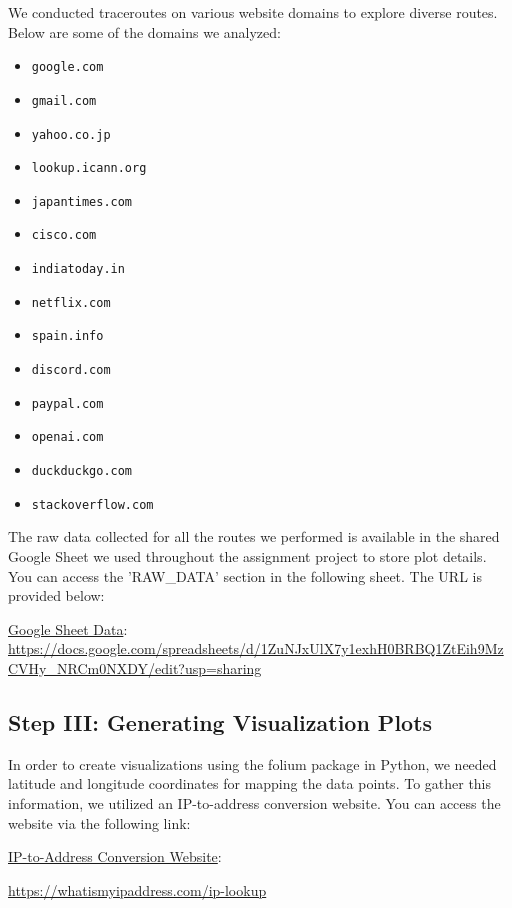 \documentclass{article}
\begin{document}
We conducted traceroutes on various website domains to explore diverse routes. Below are some of the domains we analyzed:

\begin{itemize}
    \item \texttt{google.com}
    \item \texttt{gmail.com}
    \item \texttt{yahoo.co.jp}
    \item \texttt{lookup.icann.org}
    \item \texttt{japantimes.com}
    \item \texttt{cisco.com}
    \item \texttt{indiatoday.in}
    \item \texttt{netflix.com}
    \item \texttt{spain.info}
    \item \texttt{discord.com}
    \item \texttt{paypal.com}
    \item \texttt{openai.com}
    \item \texttt{duckduckgo.com}
    \item \texttt{stackoverflow.com}
\end{itemize}
The raw data collected for all the routes we performed is available in the shared Google Sheet we used throughout the assignment project to store plot details. You can access the 'RAW\_DATA' section in the following sheet. The URL is provided below:

\href{https://docs.google.com/spreadsheets/d/1ZuNJxUlX7y1exhH0BRBQ1ZtEih9MzCVHy_NRCm0NXDY/edit?usp=sharing}{Google Sheet Data}: \\ \url{https://docs.google.com/spreadsheets/d/1ZuNJxUlX7y1exhH0BRBQ1ZtEih9MzCVHy_NRCm0NXDY/edit?usp=sharing}

\subsection{Step III: Generating Visualization Plots}

In order to create visualizations using the folium package in Python, we needed latitude and longitude coordinates for mapping the data points. To gather this information, we utilized an IP-to-address conversion website. You can access the website via the following link:

\href{https://whatismyipaddress.com/ip-lookup}{IP-to-Address Conversion Website}:

\url{https://whatismyipaddress.com/ip-lookup}
\end{document}

